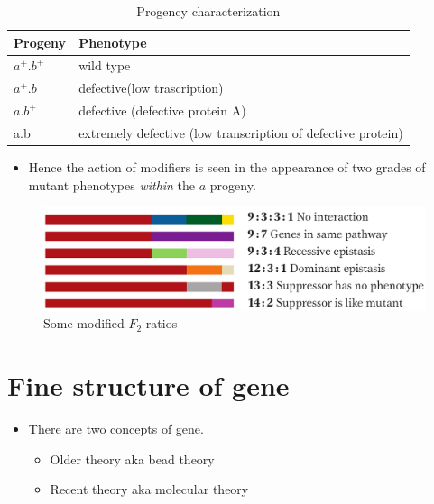 \documentclass[11pt,dvipsnames,ignorenonframetext,aspectratio=169]{beamer}
\providecommand{\tightlist}{%
  \setlength{\itemsep}{0pt}\setlength{\parskip}{0pt}}
\begin{document}
\begin{frame}{}
\protect\hypertarget{section-25}{}

\begin{table}[t]

\caption{\label{tab:gene-modifieres}Progency characterization}
\centering
\fontsize{8}{10}\selectfont
\begin{tabular}{ll}
\toprule
Progeny & Phenotype\\
\midrule
$a^+. b^+$ & wild type\\
$a^+.b$ & defective(low trascription)\\
$a.b^+$ & defective (defective protein A)\\
a.b & extremely defective (low transcription of defective protein)\\
\bottomrule
\end{tabular}
\end{table}

\begin{itemize}
\tightlist
\item
  Hence the action of modifiers is seen in the appearance of two grades
  of mutant phenotypes \emph{within} the \(a\) progeny.
\end{itemize}

\begin{figure}

{\centering \includegraphics[width=0.35\linewidth]{./../images/gene_modification_ratios} 

}

\caption{Some modified $F_2$ ratios}\label{fig:gene-modification-ratios}
\end{figure}

\end{frame}

\hypertarget{fine-structure-of-gene}{%
\section{Fine structure of gene}\label{fine-structure-of-gene}}

\begin{frame}{}
\protect\hypertarget{section-26}{}

\begin{itemize}
\tightlist
\item
  There are two concepts of gene.

  \begin{itemize}
  \tightlist
  \item
    Older theory aka bead theory
  \item
    Recent theory aka molecular theory
  \end{itemize}
\end{itemize}

\end{frame}
\end{document}
